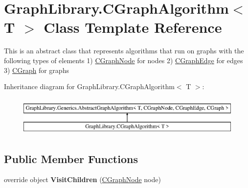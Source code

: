 \hypertarget{class_graph_library_1_1_c_graph_algorithm}{}\section{Graph\+Library.\+C\+Graph\+Algorithm$<$ T $>$ Class Template Reference}
\label{class_graph_library_1_1_c_graph_algorithm}


This is an abstract class that represents algorithms that run on graphs with the following types of elements 1) \hyperlink{class_graph_library_1_1_c_graph_node}{C\+Graph\+Node} for nodes 2) \hyperlink{class_graph_library_1_1_c_graph_edge}{C\+Graph\+Edge} for edges 3) \hyperlink{class_graph_library_1_1_c_graph}{C\+Graph} for graphs  


Inheritance diagram for Graph\+Library.\+C\+Graph\+Algorithm$<$ T $>$\+:\begin{figure}[H]
\begin{center}
\leavevmode
\includegraphics[height=2.000000cm]{class_graph_library_1_1_c_graph_algorithm}
\end{center}
\end{figure}
\subsection*{Public Member Functions}
\begin{DoxyCompactItemize}
\item 
\hypertarget{class_graph_library_1_1_c_graph_algorithm_aceea05e816d168d3a572fb03c71317c1}{}override object {\bfseries Visit\+Children} (\hyperlink{class_graph_library_1_1_c_graph_node}{C\+Graph\+Node} node)\label{class_graph_library_1_1_c_graph_algorithm_aceea05e816d168d3a572fb03c71317c1}

\end{DoxyCompactItemize}
